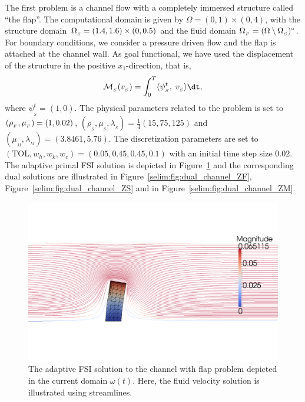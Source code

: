 The first problem is a channel flow with a completely immersed
structure called ``the flap''. The computational domain is given by
$\Omega = (0, 1)\times (0,4)$, with the structure domain $\Omega_{_{S}} = (1.4,
1.6)\times (0, 0.5)$ and the fluid domain $\Omega_{_{F}} = (\Omega\setminus
\Omega_{_{S}})^{\circ}$. For boundary conditions, we consider a pressure driven
flow and the flap is attached at the channel wall. As goal functional,
we have used the displacement of the structure in the positive
$x_1$-direction, that is,
\begin{equation}
\label{selim:eq:goalfunctional_channel}
\M_{_{S}}(v_{_{S}}) = \int_0^T \langle \psi^t_{_{S}},\;
v_{_{S}}\rangle \dt,
\end{equation}
where $\psi^t_{_{S}} = (1,0)$. The physical parameters related to the
problem is set to $(\rho_{_{F}},\mu_{_{F}}) = (1, 0.02)$,
$(\rho_{_{S}},\mu_{_{S}}, \lambda_{_{S}}) = \tfrac{1}{4}(15, 75, 125)$
and $(\mu_{_{M}}, \lambda_{_{M}}) = (3.8461, 5.76)$. The
discretization parameters are set to $(\mathrm{TOL}, w_h, w_k,w_c) =
(0.05, 0.45, 0.45, 0.1)$ with an initial time step size $0.02$. The
adaptive primal FSI solution is depicted in
Figure~\ref{selim:fig:primal_channel} and the corresponding dual
solutions are illustrated in Figure~\ref{selim:fig:dual_channel_ZF},
Figure~\ref{selim:fig:dual_channel_ZS} and in
Figure~\ref{selim:fig:dual_channel_ZM}.
\begin{figure}
  \label{selim:fig:primal_channel}
  \caption{The adaptive FSI solution to the channel with flap problem
    depicted in the current domain $\omega(t)$. Here, the fluid
    velocity solution is illustrated using streamlines.}
  \includegraphics[width=1.0\textwidth]{chapters/selim/png/channel.png}
\end{figure}

